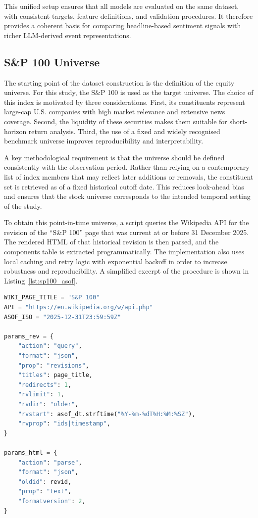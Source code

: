 This unified setup ensures that all models are evaluated on the same dataset, with consistent targets, feature definitions, and validation procedures. It therefore provides a coherent basis for comparing headline-based sentiment signals with richer LLM-derived event representations.

\subsection{S\&P 100 Universe}

The starting point of the dataset construction is the definition of the equity universe. For this study, the S\&P 100 is used as the target universe. The choice of this index is motivated by three considerations. First, its constituents represent large-cap U.S. companies with high market relevance and extensive news coverage. Second, the liquidity of these securities makes them suitable for short-horizon return analysis. Third, the use of a fixed and widely recognised benchmark universe improves reproducibility and interpretability.

A key methodological requirement is that the universe should be defined consistently with the observation period. Rather than relying on a contemporary list of index members that may reflect later additions or removals, the constituent set is retrieved as of a fixed historical cutoff date. This reduces look-ahead bias and ensures that the stock universe corresponds to the intended temporal setting of the study.

To obtain this point-in-time universe, a script queries the Wikipedia API for the revision of the ``S\&P 100'' page that was current at or before 31 December 2025. The rendered HTML of that historical revision is then parsed, and the components table is extracted programmatically. The implementation also uses local caching and retry logic with exponential backoff in order to increase robustness and reproducibility. A simplified excerpt of the procedure is shown in Listing~\ref{lst:sp100_asof}.

\begin{lstlisting}[language=Python, caption={Retrieving the S\&P 100 constituent list as of 31 December 2025}, label={lst:sp100_asof}]
WIKI_PAGE_TITLE = "S&P 100"
API = "https://en.wikipedia.org/w/api.php"
ASOF_ISO = "2025-12-31T23:59:59Z"

params_rev = {
    "action": "query",
    "format": "json",
    "prop": "revisions",
    "titles": page_title,
    "redirects": 1,
    "rvlimit": 1,
    "rvdir": "older",
    "rvstart": asof_dt.strftime("%Y-%m-%dT%H:%M:%SZ"),
    "rvprop": "ids|timestamp",
}

params_html = {
    "action": "parse",
    "format": "json",
    "oldid": revid,
    "prop": "text",
    "formatversion": 2,
}
\end{lstlisting}

